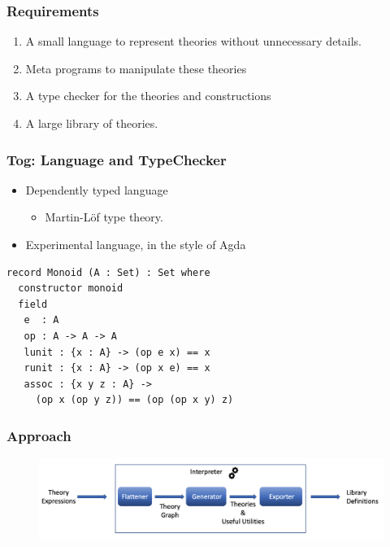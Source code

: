 \documentclass[t,10pt,numbers,fleqn,usenames,xcolor=dvipsnames]{beamer}
\begin{document}
\begin{frame}[fragile]
\frametitle{Requirements}
\begin{enumerate}
\item A small language to represent theories without unnecessary details. 
\item Meta programs to manipulate these theories  
\item A type checker for the theories and constructions 
\item A large library of theories.
\end{enumerate}
\end{frame}

\begin{frame}[fragile]
\frametitle{Tog: Language and TypeChecker}
\begin{itemize}
    \item Dependently typed language 
    \begin{itemize}
        \item Martin-L\"{o}f type theory. 
    \end{itemize}
    \item Experimental language, in the style of Agda 
\end{itemize}
\begin{verbatim}
record Monoid (A : Set) : Set where
  constructor monoid
  field
   e  : A
   op : A -> A -> A
   lunit : {x : A} -> (op e x) == x
   runit : {x : A} -> (op x e) == x
   assoc : {x y z : A} -> 
     (op x (op y z)) == (op (op x y) z)
\end{verbatim}
\end{frame}

\begin{frame}[fragile]
\frametitle{Approach} 
\begin{figure}
    \includegraphics[scale=0.2]{figures/interpreter_detailed.png}
\end{figure}
\end{frame}
\end{document}
